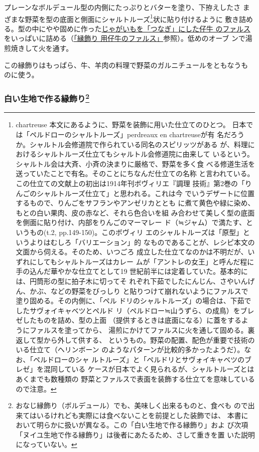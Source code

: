 \begin{recette}
プレーンなボルデュール型の内側にたっぷりとバターを塗り、下拵えしたさ
まざまな野菜を型の底面と側面にシャルトルーズ\footnote{chartreuse
  本文にあるように、野菜を装飾に用いた仕立てのひとつ。
  日本では「ペルドローのシャルトルーズ」perdreaux en chartreuseが有
  名だろうか。シャルトル会修道院で作られている同名のスピリッツがある
  が、料理におけるシャルトルーズ仕立てもシャルトル会修道院に由来して
  いるという。シャルトル会は大斉、小斉の決まりに厳格で、野菜を多く食
  べる修道生活を送っていたことで有名。そのことにちなんだ仕立ての名称
  と言われている。この仕立ての文献上の初出は1914年刊ボヴィリエ『調理
  技術』第2巻の「りんごのシャルトルーズ仕立て」と思われる。これは今
  でいうデザートに位置するもので、りんごをサフランやアンゼリカととも
  に煮て黄色や緑に染め、もとの白い果肉、皮の赤など、それら色合いを組
  み合わせて美しく型の底面を側面に貼り付け、内部をりんごのマーマレー
  ド（≒ジャム）で満たす、というもの(t.2, pp.149-150)。このボヴィリ
  エのシャルトルーズは「原型」というよりはむしろ「バリエーション」的
  なものであることが、レシピ本文の文面から伺える。そのため、いつごろ
  成立した仕立てなのかは不明だが、いずれにしてもシャルトルーズはカレー
  ムが「アントレの女王」と呼んだ程に手の込んだ華やかな仕立てとして19
  世紀前半には定着していた。基本的には、円筒形の型に拍子木に切ってそ
  れぞれ下茹でしたにんじん、さやいんげん、かぶ、などの野菜をびっしり
  と貼りつけて崩れないようにファルスで塗り固める。その内側に、「ペル
  ドリのシャルトルーズ」の場合は、下茹でしたサヴォイキャベツとペルド
  リ（ペルドロー≒山うずら、の成鳥）をブレゼしたものを詰め、型の上面
  （提供するときは底面になる）に蓋をするようにファルスを塗ってから、
  湯煎にかけてファルスに火を通して固める。裏返して型から外して供する、
  というもの。野菜の配置、配色が重要で技術のいる仕立て（ヘリンボーン
  のようなパターンが比較的多かったようだ）。なお、「ペルドローのシャ
  ルトルーズ」と「ペルドリとサヴォイキャベツのブレゼ」を混同している
  ケースが日本でよく見られるが、シャルトルーズとはあくまでも数種類の
  野菜とファルスで表面を装飾する仕立てを意味しているので注意。}状に貼り付けるように
敷き詰める。型の中にやや固めに作った\protect\hyperlink{farce-de-veau-pour-bordures}{じゃがいもを「つなぎ」にした仔牛
のファルス}をいっぱいに詰める（\protect\hyperlink{farce-de-veau-pour-bordures}{「縁飾り
用仔牛のファルス」}参照）。低めのオーブ ンで湯煎焼きして火を通す。

この縁飾りはもっぱら、牛、羊肉の料理で野菜のガルニチュールをともなうも
のに使う。

\hypertarget{bordures-en-pate-blanche}{%
\subsubsection[白い生地で作る縁飾り]{\texorpdfstring{白い生地で作る縁飾り\footnote{おなじ縁飾り（ボルデュール）でも、美味しく出来るものと、食べも
  ので出来てはいるけれども実際には食べないことを前提とした装飾では、
  本書において明らかに扱いが異なる。この「白い生地で作る縁飾り」およ
  び次項「ヌイユ生地で作る縁飾り」は後者にあたるため、さして重きを置
  いた説明になっていない。}}{白い生地で作る縁飾り}}\label{bordures-en-pate-blanche}}


\end{recette}
